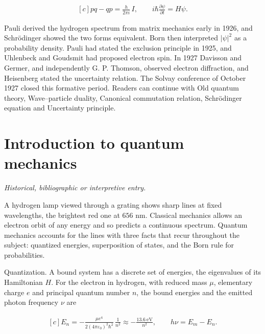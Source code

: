 \documentclass[11pt,oneside]{book}
\newenvironment{centeredalign}{\[\begin{gathered}[c]}{\end{gathered}\]}
\begin{document}
\begin{centeredalign}
pq-qp=\frac{h}{2\pi i}\,I,\qquad i\hbar\frac{\partial\psi}{\partial t}=H\psi .
\end{centeredalign}

Pauli derived the hydrogen spectrum from matrix mechanics early in 1926, and Schrödinger showed the two forms equivalent. Born then interpreted \(|\psi|^2\) as a probability density. Pauli had stated the exclusion principle in 1925, and Uhlenbeck and Goudsmit had proposed electron spin. In 1927 Davisson and Germer, and independently G. P. Thomson, observed electron diffraction, and Heisenberg stated the uncertainty relation. The Solvay conference of October 1927 closed this formative period. Readers can continue with Old quantum theory, Wave--particle duality, Canonical commutation relation, Schrödinger equation and Uncertainty principle.







\clearpage

\section{Introduction to quantum mechanics}

\label{topic:introduction-to-quantum-mechanics}

\par\smallskip\noindent\textit{Historical, bibliographic or interpretive entry.}

A hydrogen lamp viewed through a grating shows sharp lines at fixed wavelengths, the brightest red one at \(656\) nm. Classical mechanics allows an electron orbit of any energy and so predicts a continuous spectrum. Quantum mechanics accounts for the lines with three facts that recur throughout the subject: quantized energies, superposition of states, and the Born rule for probabilities.

Quantization. A bound system has a discrete set of energies, the eigenvalues of its Hamiltonian \(H\). For the electron in hydrogen, with reduced mass \(\mu\), elementary charge \(e\) and principal quantum number \(n\), the bound energies and the emitted photon frequency \(\nu\) are

\begin{centeredalign}
E_n=-\frac{\mu e^4}{2(4\pi\varepsilon_0)^2\hbar^2}\,\frac{1}{n^2}
\approx-\frac{13.6\ \mathrm{eV}}{n^2},\qquad h\nu=E_m-E_n .
\end{centeredalign}
\end{document}
